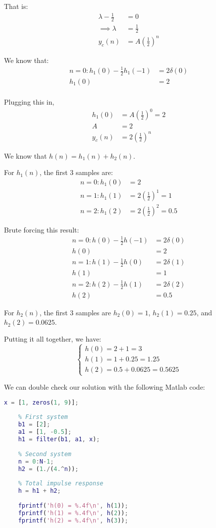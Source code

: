 \documentclass{article}
\begin{document}
That is:
\begin{align*}
    \lambda - \frac{1}{2} &= 0 \\
    \implies \lambda &= \frac{1}{2} \\
    y_c(n) &= A\left(\frac{1}{2}\right)^n
\end{align*}

We know that:
\begin{align*}
    n=0: h_1(0) - \frac{1}{2}h_1(-1) &= 2\delta(0) \\
    h_1(0) &= 2 \\
\end{align*}

Plugging this in,
\begin{align*}
    h_1(0) &= A\left(\frac{1}{2}\right)^0 = 2 \\
    A &= 2 \\
    y_c(n) &= 2\left(\frac{1}{2}\right)^n
\end{align*}

We know that $h(n) = h_1(n) + h_2(n)$.

For $h_1(n)$, the first 3 samples are:
\begin{align*}
    n=0: h_1(0) &= 2 \\
    n=1: h_1(1) &= 2\left(\frac{1}{2}\right)^1 = 1 \\
    n=2: h_1(2) &= 2\left(\frac{1}{2}\right)^2 = 0.5
\end{align*}

Brute forcing this result:
\begin{align*}
    n=0: h(0) - \frac{1}{2}h(-1) &= 2\delta(0) \\
    h(0) &= 2 \\
    n=1: h(1) - \frac{1}{2}h(0) &= 2\delta(1) \\
    h(1) &= 1 \\
    n=2: h(2) - \frac{1}{2}h(1) &= 2\delta(2) \\
    h(2) &= 0.5
\end{align*}


For $h_2(n)$, the first 3 samples are $h_2(0) = 1$, $h_2(1) = 0.25$, and $h_2(2) = 0.0625$.

Putting it all together, we have:
\[
\begin{cases}
    h(0) = 2 + 1 = 3 \\
    h(1) = 1 + 0.25 = 1.25 \\
    h(2) = 0.5 + 0.0625 = 0.5625
\end{cases}
\]

We can double check our solution with the following Matlab code:
\begin{lstlisting}[language=Matlab]
    x = [1, zeros(1, 9)];
    
    % First system
    b1 = [2];
    a1 = [1, -0.5];
    h1 = filter(b1, a1, x);
    
    % Second system
    n = 0:N-1;
    h2 = (1./(4.^n));
    
    % Total impulse response
    h = h1 + h2;
    
    fprintf('h(0) = %.4f\n', h(1));
    fprintf('h(1) = %.4f\n', h(2));
    fprintf('h(2) = %.4f\n', h(3));
\end{lstlisting}
\end{document}
